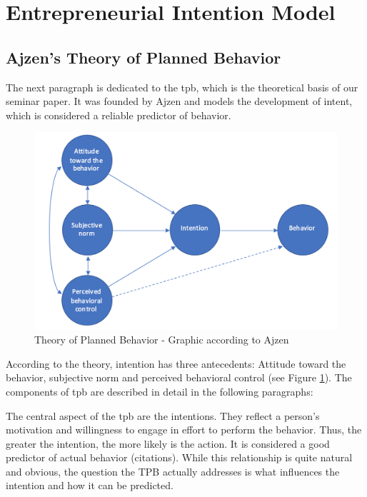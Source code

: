 \section{Entrepreneurial Intention Model}

\subsection{Ajzen's Theory of Planned Behavior}
The next paragraph is dedicated to the \acf{tpb}, which is the theoretical basis of our seminar paper. It was founded by Ajzen \cite{ajzen1991theory} and models the development of intent, which is considered a reliable predictor of behavior. 
\begin{figure}[h]
\begin{center}
\includegraphics[width=13cm]{images/Ajzen.png}
\caption{Theory of Planned Behavior - Graphic according to Ajzen \cite{ajzen1991theory}}
\label{fig:Ajzen}
\end{center}
\end{figure}

According to the theory, intention has three antecedents: Attitude toward the behavior, subjective norm and perceived behavioral control (see Figure \ref{fig:Ajzen}). The components of \ac{tpb} are described in detail in the following paragraphs:

The central aspect of the \acf{tpb} are the intentions. They reflect a person's motivation and willingness to engage in effort to perform the behavior. Thus, the greater the intention, the more likely is the action. It is considered a good predictor of actual behavior (citations). While this relationship is quite natural and obvious, the question the TPB actually addresses is what influences the intention and how it can be predicted.

